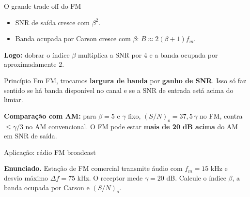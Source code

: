 \begin{frame}{O grande trade-off do FM}

\begin{itemize}
\item SNR de saída cresce com $\beta^2$.
\item Banda ocupada por Carson cresce com $\beta$: $B \approx 2(\beta + 1) f_m$.
\end{itemize}

\textbf{Logo:} dobrar o índice $\beta$ multiplica a SNR por 4 e a banda ocupada por aproximadamente 2.

\vspace{0.3cm}

\begin{block}{Princípio}
Em FM, trocamos \textbf{largura de banda} por \textbf{ganho de SNR}. Isso só faz sentido se há banda disponível no canal e se a SNR de entrada está acima do limiar.
\end{block}

\textbf{Comparação com AM:} para $\beta = 5$ e $\gamma$ fixo, $(S/N)_o = 37{,}5\,\gamma$ no FM, contra $\le \gamma/3$ no AM convencional. O FM pode estar \textbf{mais de 20 dB acima} do AM em SNR de saída.

\end{frame}


\begin{frame}{Aplicação: rádio FM broadcast}

\textbf{Enunciado.} Estação de FM comercial transmite áudio com $f_m = 15$ kHz e desvio máximo $\Delta f = 75$ kHz. O receptor mede $\gamma = 20$ dB. Calcule o índice $\beta$, a banda ocupada por Carson e $(S/N)_o$.

\begin{center}
\end{center}

\end{frame}

